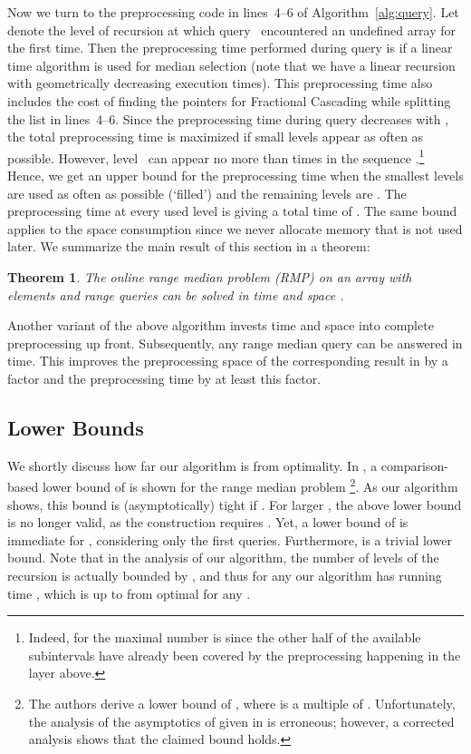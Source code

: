 \documentclass[a4paper,10pt]{article}
\newtheorem{theorem}{Theorem}
\begin{document}
Now we turn to the preprocessing code in lines~4--6 of
Algorithm~\ref{alg:query}.  Let  denote the level of recursion
at which query~ encountered an undefined array  for the
first time. Then the preprocessing time performed during query  is
 if a linear time algorithm is used for median
selection \cite{DBLP:conf/stoc/BlumFPRT72} (note that we have a linear
recursion with geometrically decreasing execution times).
This preprocessing time also includes the cost of 
finding the pointers for Fractional Cascading while splitting the list in lines~4--6.
Since the preprocessing time during query 
decreases with , the total preprocessing time is maximized if
small levels  appear as often as possible.  However, level~
can appear no more than  times in the
sequence .\footnote{Indeed, for  the maximal number is  since the other half of the available subintervals have already been covered by the preprocessing happening in the layer above.}  Hence,
we get an upper bound for the preprocessing time when the smallest 
levels are used as often as possible (`filled') and the remaining
levels are .  The preprocessing time at every used
level is  giving a total time of . The same bound
applies to the space consumption since we never allocate memory that
is not used later.
We summarize the main result of this section in a theorem:
\begin{theorem}
  The online range median problem (RMP) on an array with  elements
  and  range queries can be solved in time   and
  space .
\end{theorem}


Another variant of the above algorithm invests  time and space
into complete preprocessing up front. Subsequently,  any range median query can be answered in  time.
This improves the preprocessing
space of the corresponding result in \cite{DBLP:journals/njc/KrizancMS05} by a factor  and the preprocessing time by at least this factor.


\subsection{Lower Bounds}
\label{ss:lowerbound}


We shortly discuss how far our algorithm is from optimality.
In \cite{DBLP:conf/esa/Har-PeledM08}, 
a comparison-based lower bound of  is shown for the range median problem 
\footnote{The authors derive a lower bound of , where  is a multiple of . Unfortunately, the analysis of the asymptotics of  given in \cite{DBLP:conf/esa/Har-PeledM08} is erroneous; however, a corrected analysis shows that the claimed  bound holds.}. 
As our algorithm shows, this bound is (asymptotically) tight if .
For larger , the above lower bound is no longer valid, as the construction requires . 
Yet, a lower bound of  is immediate for , considering only the first  queries.
Furthermore,  is a trivial lower bound.
Note that in the analysis of our algorithm, the number of levels of the recursion is
actually bounded by , and 
thus
for any  our algorithm has running time ,
which is up to  from optimal for any .
\end{document}
